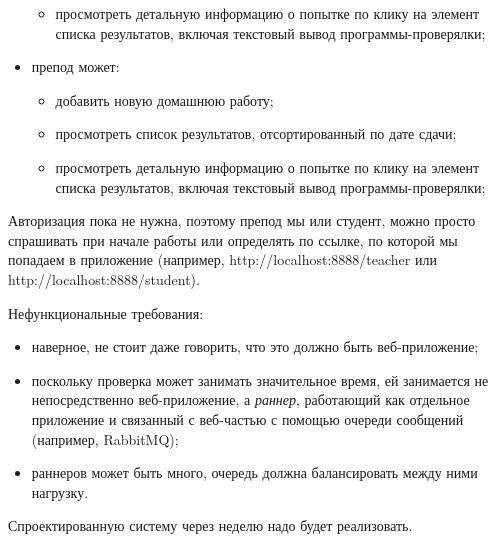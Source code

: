\documentclass[a5paper]{homework}
\begin{document}
\begin{itemize}
\begin{itemize}
        \item просмотреть детальную информацию о попытке по клику на элемент списка результатов, включая текстовый вывод программы-проверялки;
    \end{itemize}
    \item препод может:
    \begin{itemize}
        \item добавить новую домашнюю работу;
        \item просмотреть список результатов, отсортированный по дате сдачи;
        \item просмотреть детальную информацию о попытке по клику на элемент списка результатов, включая текстовый вывод программы-проверялки;
    \end{itemize}
\end{itemize}

Авторизация пока не нужна, поэтому препод мы или студент, можно просто спрашивать при начале работы или определять по ссылке, по которой мы попадаем в приложение (например, http://localhost:8888/teacher или http://localhost:8888/student).

Нефункциональные требования:

\begin{itemize}
    \item наверное, не стоит даже говорить, что это должно быть веб-приложение;
    \item поскольку проверка может занимать значительное время, ей занимается не непосредственно веб-приложение, а \emph{раннер}, работающий как отдельное приложение и связанный с веб-частью с помощью очереди сообщений (например, RabbitMQ);
    \item раннеров может быть много, очередь должна балансировать между ними нагрузку.
\end{itemize}

Спроектированную систему через неделю надо будет реализовать.
\end{document}
